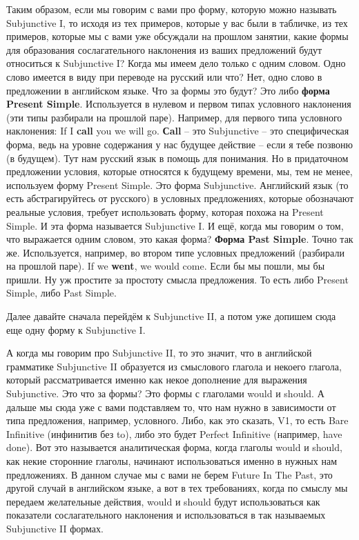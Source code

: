 \documentclass[main.tex]{subfiles}
\begin{document}
Таким образом, если мы говорим с вами про форму, которую можно называть Subjunctive I, то исходя из тех примеров, которые у вас были в табличке, из тех примеров, которые мы с вами уже обсуждали на прошлом занятии, какие формы для образования сослагательного наклонения из ваших предложений будут относиться к Subjunctive I?
Когда мы имеем дело только с одним словом.
Одно слово имеется в виду при переводе на русский или что?
Нет, одно слово в предложении в английском языке.
Что за формы это будут?
Это либо \textbf{форма Present Simple}.
Используется в нулевом и первом типах условного наклонения (эти типы разбирали на прошлой паре).
Например, для первого типа условного наклонения:
If I \textbf{call} you we will go.
\textbf{Сall} -- это Subjunctive -- это специфическая форма, ведь на уровне содержания у нас будущее действие -- если я тебе позвоню (в будущем).
Тут нам русский язык в помощь для понимания.
Но в придаточном предложении условия, которые относятся к будущему времени, мы, тем не менее, используем форму Present Simple.
Это форма Subjunctive.
Английский язык (то есть абстрагируйтесь от русского) в условных предложениях, которые обозначают реальные условия, требует использовать форму, которая похожа на Present Simple.
И эта форма называется Subjunctive I.
И ещё, когда мы говорим о том, что выражается одним словом, это какая форма?
\textbf{Форма Past Simple}.
Точно так же.
Используется, например, во втором типе условных предложений (разбирали на прошлой паре).
If we \textbf{went}, we would come.
Если бы мы пошли, мы бы пришли.
Ну уж простите за простоту смысла предложения.
То есть либо Present Simple, либо Past Simple.

Далее давайте сначала перейдём к Subjunctive II, а потом уже допишем сюда еще одну форму к Subjunctive I.

А когда мы говорим про Subjunctive II, то это значит, что в английской грамматике Subjunctive II образуется из смыслового глагола и некоего глагола, который рассматривается именно как некое дополнение для выражения Subjunctive.
Это что за формы?
Это формы с глаголами would и should.
А дальше мы сюда уже с вами подставляем то, что нам нужно в зависимости от типа предложения, например, условного.
Либо, как это сказать, V1, то есть Bare Infinitive (инфинитив без to), либо это будет Perfect Infinitive (например, have done).
Вот это называется аналитическая форма, когда глаголы would и should, как некие сторонние глаголы, начинают использоваться именно в нужных нам предложениях.
В данном случае мы с вами не берем Future In The Past, это другой случай в английском языке, а вот в тех требованиях, когда по смыслу мы передаем желательные действия, would и should будут использоваться как показатели сослагательного наклонения и использоваться в так называемых Subjunctive II формах.
\end{document}
